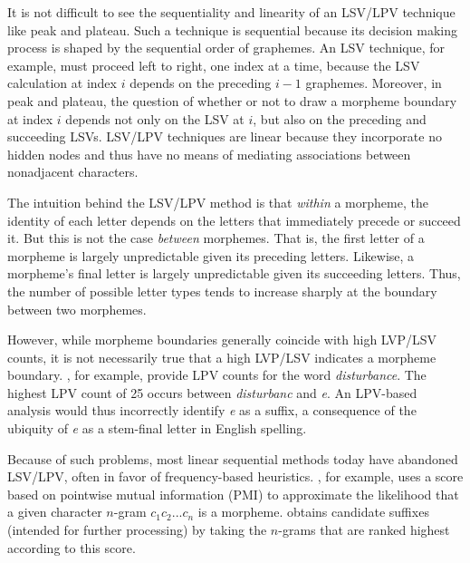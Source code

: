 It is not difficult to see the sequentiality and linearity of an LSV/LPV technique like peak and plateau.
Such a technique is sequential because its decision making process is shaped by the sequential order of graphemes.
An LSV technique, for example, must proceed left to right, one index at a time, because the LSV calculation at index $i$ depends on the preceding $i-1$ graphemes. Moreover, in peak and plateau, the question of whether or not to draw a morpheme boundary at index $i$ depends not only on the LSV at $i$, but also on the preceding and succeeding LSVs. LSV/LPV techniques are linear because they incorporate no hidden nodes and thus have no means of mediating associations between nonadjacent characters.

The intuition behind the LSV/LPV method is that \emph{within} a morpheme, the identity of each letter depends on the letters that immediately precede or succeed it. But this is not the case \emph{between} morphemes. That is, the first letter of a morpheme is largely unpredictable given its preceding letters. Likewise, a morpheme's final letter is largely unpredictable given its succeeding letters. Thus, the number
 of possible letter types tends to increase sharply at the boundary between two morphemes.

However, while morpheme boundaries generally coincide with high LVP/LSV counts, it is not necessarily true that a high LVP/LSV indicates a morpheme boundary.
\cite{hammarstrom:2011}, for example, provide LPV counts for the word \textit{disturbance}. 
The highest LPV count of 25 
occurs between \textit{disturbanc} and \textit{e}.
An LPV-based analysis would thus incorrectly identify \textit{e} as a suffix, a consequence of the ubiquity of \textit{e} as a stem-final letter in English spelling. 

Because of such problems, most linear sequential methods today have abandoned LSV/LPV, often in favor of frequency-based heuristics.
\cite{goldsmith:2001}, for example, uses a score based on pointwise mutual information (PMI) to approximate the likelihood that a given character $n$-gram $c_{1}c_{2}...c_{n}$ is a morpheme. 
\cite{goldsmith:2001} obtains candidate suffixes (intended for further processing) by taking the $n$-grams that are ranked highest according to this score.  

